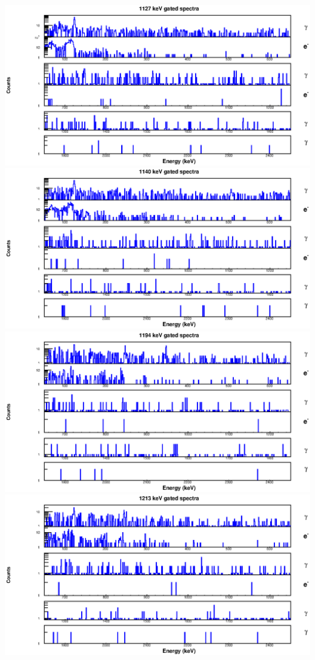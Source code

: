 \begin{landscape}
\includegraphics[scale=1.2]{154Gd_Appendix/1127_combined.eps}
\includegraphics[scale=1.2]{154Gd_Appendix/1140_combined.eps}
\includegraphics[scale=1.2]{154Gd_Appendix/1194_combined.eps}
\includegraphics[scale=1.2]{154Gd_Appendix/1213_combined.eps}

\end{landscape}
